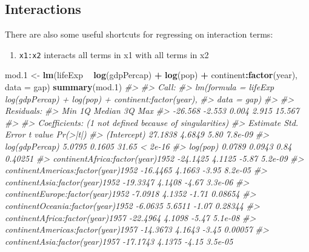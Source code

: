 \documentclass[]{book}
\newenvironment{Shaded}{\begin{snugshade}}{\end{snugshade}}
\newcommand{\KeywordTok}[1]{\textcolor[rgb]{0.13,0.29,0.53}{\textbf{#1}}}
\newcommand{\DataTypeTok}[1]{\textcolor[rgb]{0.13,0.29,0.53}{#1}}
\newcommand{\DecValTok}[1]{\textcolor[rgb]{0.00,0.00,0.81}{#1}}
\newcommand{\StringTok}[1]{\textcolor[rgb]{0.31,0.60,0.02}{#1}}
\newcommand{\CommentTok}[1]{\textcolor[rgb]{0.56,0.35,0.01}{\textit{#1}}}
\newcommand{\OperatorTok}[1]{\textcolor[rgb]{0.81,0.36,0.00}{\textbf{#1}}}
\newcommand{\NormalTok}[1]{#1}
\providecommand{\tightlist}{%
  \setlength{\itemsep}{0pt}\setlength{\parskip}{0pt}}
\begin{document}
\subsection{Interactions}\label{interactions}

There are also some useful shortcuts for regressing on interaction
terms:

\begin{enumerate}
\def\labelenumi{\arabic{enumi}.}
\tightlist
\item
  \texttt{x1:x2} interacts all terms in x1 with all terms in x2
\end{enumerate}

\begin{Shaded}
\begin{Highlighting}[]
\NormalTok{mod.}\DecValTok{1}\NormalTok{ <-}\StringTok{ }\KeywordTok{lm}\NormalTok{(lifeExp }\OperatorTok{~}\StringTok{ }\KeywordTok{log}\NormalTok{(gdpPercap) }\OperatorTok{+}\StringTok{ }\KeywordTok{log}\NormalTok{(pop) }\OperatorTok{+}\StringTok{ }\NormalTok{continent}\OperatorTok{:}\KeywordTok{factor}\NormalTok{(year), }\DataTypeTok{data =}\NormalTok{ gap)}
\KeywordTok{summary}\NormalTok{(mod.}\DecValTok{1}\NormalTok{)}
\CommentTok{#> }
\CommentTok{#> Call:}
\CommentTok{#> lm(formula = lifeExp ~ log(gdpPercap) + log(pop) + continent:factor(year), }
\CommentTok{#>     data = gap)}
\CommentTok{#> }
\CommentTok{#> Residuals:}
\CommentTok{#>     Min      1Q  Median      3Q     Max }
\CommentTok{#> -26.568  -2.553   0.004   2.915  15.567 }
\CommentTok{#> }
\CommentTok{#> Coefficients: (1 not defined because of singularities)}
\CommentTok{#>                                    Estimate Std. Error t value Pr(>|t|)}
\CommentTok{#> (Intercept)                         27.1838     4.6849    5.80  7.8e-09}
\CommentTok{#> log(gdpPercap)                       5.0795     0.1605   31.65  < 2e-16}
\CommentTok{#> log(pop)                             0.0789     0.0943    0.84  0.40251}
\CommentTok{#> continentAfrica:factor(year)1952   -24.1425     4.1125   -5.87  5.2e-09}
\CommentTok{#> continentAmericas:factor(year)1952 -16.4465     4.1663   -3.95  8.2e-05}
\CommentTok{#> continentAsia:factor(year)1952     -19.3347     4.1408   -4.67  3.3e-06}
\CommentTok{#> continentEurope:factor(year)1952    -7.0918     4.1352   -1.71  0.08654}
\CommentTok{#> continentOceania:factor(year)1952   -6.0635     5.6511   -1.07  0.28344}
\CommentTok{#> continentAfrica:factor(year)1957   -22.4964     4.1098   -5.47  5.1e-08}
\CommentTok{#> continentAmericas:factor(year)1957 -14.3673     4.1643   -3.45  0.00057}
\CommentTok{#> continentAsia:factor(year)1957     -17.1743     4.1375   -4.15  3.5e-05}

\end{Highlighting}
\end{Shaded}
\end{document}

